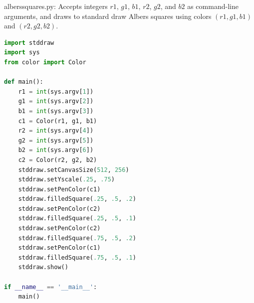 \documentclass[8pt,a4paper,compress,handout]{beamer}
\begin{document}
\begin{frame}[fragile]
\begin{framed}
\tiny alberssquares.py: Accepts integers $r1$, $g1$, $b1$, $r2$, $g2$, and $b2$ as command-line arguments, and draws to standard draw Albers squares using colors $(r1, g1, b1)$ and $(r2, g2, b2)$.
\end{framed}

\begin{lstlisting}[language=Python]
import stddraw
import sys
from color import Color

def main():
    r1 = int(sys.argv[1])
    g1 = int(sys.argv[2])
    b1 = int(sys.argv[3])
    c1 = Color(r1, g1, b1)
    r2 = int(sys.argv[4])
    g2 = int(sys.argv[5])
    b2 = int(sys.argv[6])
    c2 = Color(r2, g2, b2)
    stddraw.setCanvasSize(512, 256)
    stddraw.setYscale(.25, .75)
    stddraw.setPenColor(c1)
    stddraw.filledSquare(.25, .5, .2)
    stddraw.setPenColor(c2)
    stddraw.filledSquare(.25, .5, .1)
    stddraw.setPenColor(c2)
    stddraw.filledSquare(.75, .5, .2)
    stddraw.setPenColor(c1)
    stddraw.filledSquare(.75, .5, .1)
    stddraw.show()

if __name__ == '__main__':
    main()
\end{lstlisting}
\end{frame}
\end{document}
